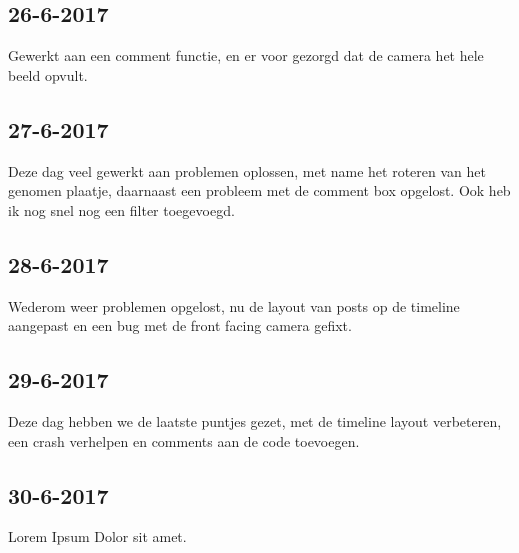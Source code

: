 \documentclass{uva-inf-article}
\begin{document}
\subsection{26-6-2017}
Gewerkt aan een comment functie, en er voor gezorgd dat de camera het hele
beeld opvult.
\subsection{27-6-2017}
Deze dag veel gewerkt aan problemen oplossen, met name het roteren van het
genomen plaatje, daarnaast een probleem met de comment box opgelost. Ook heb
ik nog snel nog een filter toegevoegd.
\subsection{28-6-2017}
Wederom weer problemen opgelost, nu de layout van posts op de timeline
aangepast en een bug met de front facing camera gefixt.
\subsection{29-6-2017}
Deze dag hebben we de laatste puntjes gezet, met de timeline layout
verbeteren, een crash verhelpen en comments aan de code toevoegen.
\subsection{30-6-2017}
Lorem Ipsum Dolor sit amet.
\end{document}

